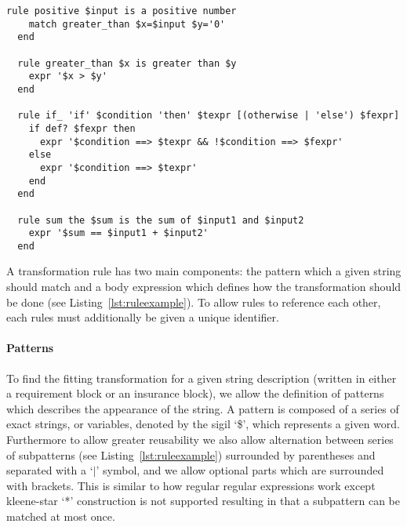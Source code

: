\begin{lstlisting}[caption={Different Types of Transformation Rules},label={lst:ruleexample}]
  rule positive $input is a positive number
    match greater_than $x=$input $y='0'
  end

  rule greater_than $x is greater than $y
    expr '$x > $y'
  end

  rule if_ 'if' $condition 'then' $texpr [(otherwise | 'else') $fexpr]
    if def? $fexpr then
      expr '$condition ==> $texpr && !$condition ==> $fexpr'
    else
      expr '$condition ==> $texpr'
    end
  end

  rule sum the $sum is the sum of $input1 and $input2
    expr '$sum == $input1 + $input2'
  end
\end{lstlisting}

A transformation rule has two main components: the pattern which a given
string should match and a body expression which defines how the
transformation should be done (see Listing~\ref{lst:ruleexample}).
To allow rules to reference each other, each rules must additionally be
given a unique identifier.

\paragraph{Patterns}
\label{par:Patterns}

To find the fitting transformation for a given string description
(written in either a requirement block or an insurance block), we allow the
definition of patterns which describes the appearance of the string.
A pattern is composed of a series of exact strings, or variables,
denoted by the sigil `\$', which represents a given word.
Furthermore to allow greater reusability we also allow alternation between
series of subpatterns (see Listing~\ref{lst:ruleexample}) surrounded by parentheses and
separated with a `$\vert$' symbol, and we allow optional parts which are
surrounded with brackets.  This is similar to how regular regular
expressions work except kleene-star `*' construction is not supported
resulting in that a subpattern can be matched at most once.

